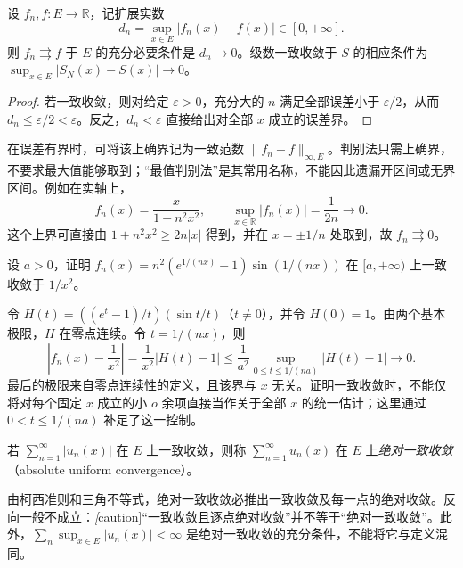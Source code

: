 \documentclass[UTF8,12pt,a4paper,fontset=fandol]{ctexbook}
\begin{document}
\begin{theorem}[上确界判别法]
\label{thm:uniform-convergence-supremum-test}
设 $f_n,f:E\to\mathbb R$，记扩展实数
\[
    d_n=\sup_{x\in E}|f_n(x)-f(x)|\in[0,+\infty].
\]
则 $f_n\rightrightarrows f$ 于 $E$ 的充分必要条件是 $d_n\to0$。级数一致收敛于 $S$ 的相应条件为 $\sup_{x\in E}|S_N(x)-S(x)|\to0$。
\end{theorem}

\begin{proof}
若一致收敛，则对给定 $\varepsilon>0$，充分大的 $n$ 满足全部误差小于 $\varepsilon/2$，从而 $d_n\leq\varepsilon/2<\varepsilon$。反之，$d_n<\varepsilon$ 直接给出对全部 $x$ 成立的误差界。
\end{proof}

在误差有界时，可将该上确界记为一致范数 $\|f_n-f\|_{\infty,E}$。判别法只需上确界，不要求最大值能够取到；“最值判别法”是其常用名称，不能因此遗漏开区间或无界区间。例如在实轴上，
\[
    f_n(x)=\frac{x}{1+n^2x^2},\qquad
    \sup_{x\in\mathbb R}|f_n(x)|=\frac1{2n}\longrightarrow0.
\]
这个上界可直接由 $1+n^2x^2\geq2n|x|$ 得到，并在 $x=\pm1/n$ 处取到，故 $f_n\rightrightarrows0$。

\begin{example}
\label{ex:uniform-composite-exponential-limit}
设 $a>0$，证明 $f_n(x)=n^2(e^{1/(nx)}-1)\sin(1/(nx))$ 在 $[a,+\infty)$ 上一致收敛于 $1/x^2$。
\end{example}

\begin{solve}
令 $H(t)=((e^t-1)/t)(\sin t/t)$（$t\neq0$），并令 $H(0)=1$。由两个基本极限，$H$ 在零点连续。令 $t=1/(nx)$，则
\[
    \left|f_n(x)-\frac1{x^2}\right|
       =\frac1{x^2}|H(t)-1|
       \leq\frac1{a^2}\sup_{0\leq t\leq1/(na)}|H(t)-1|
       \longrightarrow0.
\]
最后的极限来自零点连续性的定义，且该界与 $x$ 无关。证明一致收敛时，不能仅将对每个固定 $x$ 成立的小 $o$ 余项直接当作关于全部 $x$ 的统一估计；这里通过 $0<t\leq1/(na)$ 补足了这一控制。
\end{solve}

\begin{definition}
\label{def:absolute-uniform-convergence}
若 $\sum_{n=1}^\infty|u_n(x)|$ 在 $E$ 上一致收敛，则称 $\sum_{n=1}^\infty u_n(x)$ 在 $E$ 上\emph{绝对一致收敛}（absolute uniform convergence）。
\end{definition}

由柯西准则和三角不等式，绝对一致收敛必推出一致收敛及每一点的绝对收敛。反向一般不成立：\emph[caution]{“一致收敛且逐点绝对收敛”并不等于“绝对一致收敛”}。此外，$\sum_n\sup_{x\in E}|u_n(x)|<\infty$ 是绝对一致收敛的充分条件，不能将它与定义混同。
\end{document}
